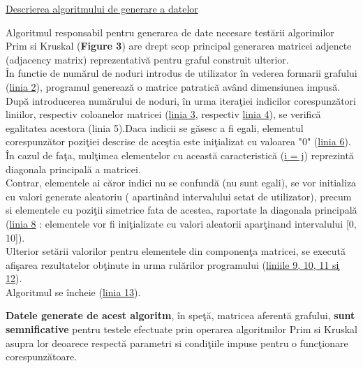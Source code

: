 \documentclass[14pt]{article}
\begin{document}
\vspace{3mm}

\large\underline{{Descrierea algoritmului de generare a datelor}}
\vspace{3mm}

Algoritmul responsabil pentru generarea de date necesare test\u{a}rii algorimilor Prim si Kruskal (\textbf{Figure 3}) are drept scop principal generarea matricei adjencte (adjacency matrix) reprezentativ\u{a} pentru graful construit ulterior.\\

\^In functie de num\u{a}rul de noduri introdus de utilizator \^in vederea formarii grafului (\underline{linia 2}), programul genereaz\u{a} o matrice patratic\u{a} av\^and dimensiunea impus\u{a}.\\

Dup\u{a} introducerea num\u{a}rului de noduri, \^in urma itera\c tiei indicilor corespunz\u{a}tori liniilor, respectiv coloanelor matricei (\underline{linia 3}, respectiv \underline{linia 4}), se verific\u{a} egalitatea acestora (linia 5).Daca indicii se g\u{a}sesc a fi egali, elementul corespunz\u{a}tor pozi\c tiei descrise de ace\c stia este ini\c tializat cu valoarea "0" (\underline{linia 6}).\\

\^In cazul de fa\c ta, mul\c timea elementelor cu aceast\u{a} caracteristic\u{a} (\underline{i = j}) reprezint\u{a} diagonala principal\u{a} a matricei.\\

Contrar, elementele ai c\u{a}ror indici nu se confund\u{a} (nu sunt egali), se vor initializa cu valori generate aleatoriu ( apartin\^and intervalului setat de utilizator), precum si elementele cu pozi\c tii simetrice fata de acestea, raportate la diagonala principal\u{a} (\underline{linia 8} : elementele vor fi ini\c tializate cu valori aleatorii apar\c tinand intervalului [0, 10]).\\

Ulterior set\u{a}rii valorilor pentru elementele din componen\c ta matricei, se execut\u{a} afi\c sarea rezultatelor ob\c tinute in urma rul\u{a}rilor programului (\underline{liniile 9, 10, 11 s\c i 12}).\\

Algoritmul se \^incheie (\underline{linia 13}).\\

\vspace{2mm}

\textbf{Datele generate de acest algoritm}, \^in spe\c t\u{a}, matricea aferent\u{a} grafului, \textbf{sunt semnificative} pentru testele efectuate prin operarea algoritmilor Prim si Kruskal asupra lor deoarece respect\u{a} parametri si condi\c tiile impuse pentru o func\c tionare corespunz\u{a}toare.\\
\end{document}
